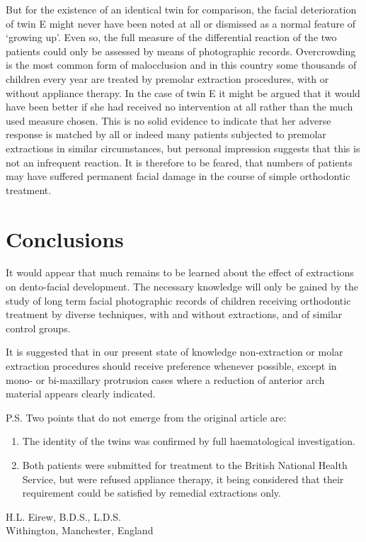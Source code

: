 \documentclass{article}
\begin{document}
But for the existence of an identical twin for comparison, the facial deterioration of twin E might never have been noted at all or dismissed as a normal feature of ‘growing up’.
Even so, the full measure of the differential reaction of the two patients could only be assessed by means of photographic records.
Overcrowding is the most common form of malocclusion and in this country some thousands of children every year are treated by premolar extraction procedures, with or without appliance therapy.
In the case of twin E it might be argued that it would have been better if she had received no intervention at all rather than the much used measure chosen.
This is no solid evidence to indicate that her adverse response is matched by all or indeed many patients subjected to premolar extractions in similar circumstances, but personal impression suggests that this is not an infrequent reaction.
It is therefore to be feared, that numbers of patients may have suffered permanent facial damage in the course of simple orthodontic treatment.

\section*{Conclusions}

It would appear that much remains to be learned about the effect of extractions on dento-facial development.
The necessary knowledge will only be gained by the study of long term facial photographic records of children receiving orthodontic treatment by diverse techniques, with and without extractions, and of similar control groups.

It is suggested that in our present state of knowledge non-extraction or molar extraction procedures should receive preference whenever possible, except in mono- or bi-maxillary protrusion cases where a reduction of anterior arch material appears clearly indicated.

P.S. Two points that do not emerge from the original article are:
\begin{enumerate}
\item The identity of the twins was confirmed by full haematological investigation.
\item Both patients were submitted for treatment to the British National Health Service, but were refused appliance therapy, it being considered that their requirement could be satisfied by remedial extractions only.
\end{enumerate}

\raggedleft
H.L. Eirew, B.D.S., L.D.S. \\
Withington, Manchester, England \\
\raggedright
\end{document}
